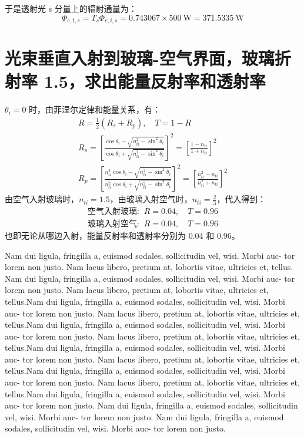 \documentclass[a4paper]{article}  %
\theoremstyle{MyLineTheoremStyle} %
\theoremstyle{MyBlockTheoremStyle} %
\theoremstyle{MySubsubsectionStyle} %
\begin{document}
\begin{multicols*}{4}
于是透射光 s 分量上的辐射通量为：
\begin{equation}
\Phi_{e,t,s} = T_s \Phi_{e,i,s} = 0.743067 \times 500 \ \mathrm{W} =  371.5335 \ \mathrm{W}
\end{equation}


\section{光束垂直入射到玻璃-空气界面，玻璃折射率 1.5，求出能量反射率和透射率}

$\theta_i = 0$ 时，由菲涅尔定律和能量关系，有：
\begin{gather}
    R =  \frac{1}{2}(R_s + R_p),\quad  T = 1 - R\\ 
    R_s =  \left[ \frac{ \cos \theta_i - \sqrt{n_{ti}^2 - \sin^2 \theta_i} }{\cos \theta_i + \sqrt{n_{ti}^2 - \sin^2 \theta_i}} \right]^2 = \left[ \frac{1 - n_{ti}}{1 + n_{ti}} \right]^2 
    \\ 
    R_p = \left[ \frac{ n_{ti}^2\cos \theta_i - \sqrt{n_{ti}^2 - \sin^2 \theta_i} }{n_{ti}^2\cos \theta_i + \sqrt{n_{ti}^2 - \sin^2 \theta_i}} \right]^2 =  \left[ \frac{n_{ti}^2 - n_{ti}}{n_{ti}^2 + n_{ti}} \right]^2
\end{gather}
由空气入射玻璃时，$n_{ti} = 1.5$，由玻璃入射空气时，$n_{ti} = \frac{2}{3}$，代入得到：
\begin{gather*}
\text{空气入射玻璃: }\ R = 0.04,\quad  T = 0.96 \\ 
\text{玻璃入射空气: }\ R = 0.04,\quad  T = 0.96 
\end{gather*}
也即无论从哪边入射，能量反射率和透射率分别为 0.04 和 0.96。



Nam dui ligula, fringilla a, euismod sodales, sollicitudin vel, wisi. Morbi auc-
tor lorem non justo. Nam lacus libero, pretium at, lobortis vitae, ultricies et, tellus.
Nam dui ligula, fringilla a, euismod sodales, sollicitudin vel, wisi. Morbi auc-
tor lorem non justo. Nam lacus libero, pretium at, lobortis vitae, ultricies et, tellus.Nam dui ligula, fringilla a, euismod sodales, sollicitudin vel, wisi. Morbi auc-
tor lorem non justo. Nam lacus libero, pretium at, lobortis vitae, ultricies et, tellus.Nam dui ligula, fringilla a, euismod sodales, sollicitudin vel, wisi. Morbi auc-
tor lorem non justo. Nam lacus libero, pretium at, lobortis vitae, ultricies et, tellus.Nam dui ligula, fringilla a, euismod sodales, sollicitudin vel, wisi. Morbi auc-
tor lorem non justo. Nam lacus libero, pretium at, lobortis vitae, ultricies et, tellus.Nam dui ligula, fringilla a, euismod sodales, sollicitudin vel, wisi. Morbi auc-
tor lorem non justo. Nam lacus libero, pretium at, lobortis vitae, ultricies et, tellus.Nam dui ligula, fringilla a, euismod sodales, sollicitudin vel, wisi. Morbi auc-
tor lorem non justo. Nam dui ligula, fringilla a, euismod sodales, sollicitudin vel, wisi. Morbi auc-
tor lorem non justo. Nam dui ligula, fringilla a, euismod sodales, sollicitudin vel, wisi. Morbi auc-
tor lorem non justo. 



\end{multicols*}
\end{document}
